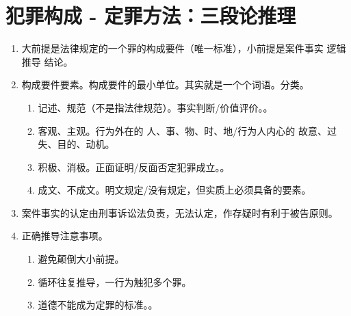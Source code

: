 \section{犯罪构成 - 定罪方法：三段论推理}
\begin{enumerate}
  \item 大前提是法律规定的一个罪的构成要件（唯一标准），小前提是案件事实 \yjt 逻辑推导 \yjt 结论。
  \item 构成要件要素。构成要件的最小单位。其实就是一个个词语。分类。
        \begin{enumerate}
          \item 记述、规范（不是指法律规范）。事实判断/价值评价。。
          \item 客观、主观。行为外在的 \yjt 人、事、物、时、地/行为人内心的 \yjt 故意、过失、目的、动机。
          \item 积极、消极。正面证明/反面否定犯罪成立。。
          \item 成文、不成文。明文规定/没有规定，但实质上必须具备的要素。
        \end{enumerate}
  \item 案件事实的认定由刑事诉讼法负责，无法认定，作存疑时有利于被告原则。
  \item 正确推导注意事项。
        \begin{enumerate}
          \item 避免颠倒大小前提。
          \item 循环往复推导，一行为触犯多个罪。
          \item 道德不能成为定罪的标准。。
        \end{enumerate}
\end{enumerate}
